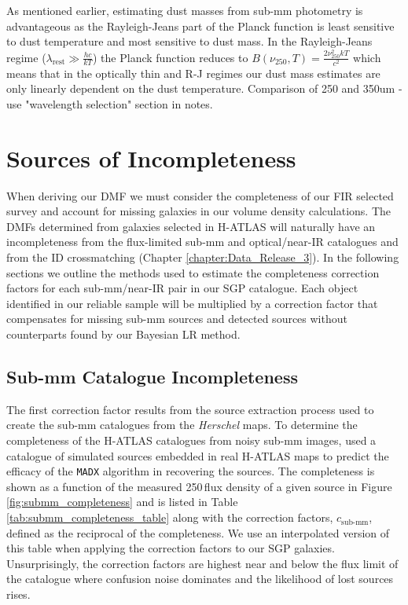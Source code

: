 As mentioned earlier, estimating dust masses from sub-mm photometry is advantageous as the Rayleigh-Jeans part of the Planck function is least sensitive to dust temperature and most sensitive to dust mass. In the Rayleigh-Jeans regime ($\lambda_{\textrm{rest}} \gg \frac{hc}{kT}$) the Planck function reduces to $B(\nu_{250}, T) = \frac{2\nu_{250}^{2}kT}{c^2}$ which means that in the optically thin and R-J regimes our dust mass estimates are only linearly dependent on the dust temperature. {\color{red} Comparison of 250 and 350um - use "wavelength selection" section in notes.}

\section{Sources of Incompleteness}

When deriving our DMF we must consider the completeness of our FIR selected survey and account for missing galaxies in our volume density calculations. The DMFs determined from galaxies selected in H-ATLAS will naturally have an incompleteness from the flux-limited sub-mm and optical/near-IR catalogues and from the ID crossmatching (Chapter \ref{chapter:Data_Release_3}). In the following sections we outline the methods used to estimate the completeness correction factors for each sub-mm/near-IR pair in our SGP catalogue. Each object identified in our reliable sample will be multiplied by a correction factor that compensates for missing sub-mm sources and detected sources without counterparts found by our Bayesian LR method. 

\subsection{Sub-mm Catalogue Incompleteness}

The first correction factor results from the source extraction process used to create the sub-mm catalogues from the \textit{Herschel} maps. To determine the completeness of the H-ATLAS catalogues from noisy sub-mm images, \citealt{Valiante_2016} used a catalogue of simulated sources embedded in real H-ATLAS maps to predict the efficacy of the \texttt{MADX} algorithm in recovering the sources. The completeness is shown as a function of the measured 250\,\micron flux density of a given source in Figure \ref{fig:submm_completeness} and is listed in Table \ref{tab:submm_completeness_table} along with the correction factors, $c_{\textrm{sub-mm}}$, defined as the reciprocal of the completeness. We use an interpolated version of this table when applying the correction factors to our SGP galaxies. Unsurprisingly, the correction factors are highest near and below the flux limit of the catalogue where confusion noise dominates and the likelihood of lost sources rises. 

